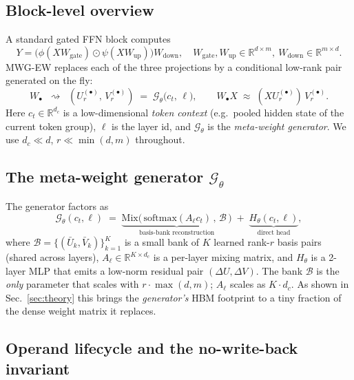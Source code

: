 \documentclass[11pt]{article}
\theoremstyle{definition}
\newcommand{\R}{\mathbb{R}}
\begin{document}
\subsection{Block-level overview}

A standard gated FFN block computes
\begin{equation}
Y = \big(\phi(XW_{\text{gate}})\odot \psi(XW_{\text{up}})\big)W_{\text{down}},
\quad W_{\text{gate}},W_{\text{up}}\in\R^{d\times m},\ W_{\text{down}}\in\R^{m\times d}.
\end{equation}
MWG-EW replaces each of the three projections by a conditional low-rank pair generated on the fly:
\begin{equation}
\boxed{\;\;
W_\bullet \;\;\rightsquigarrow\;\; (U^{(\bullet)}_r,\,V^{(\bullet)}_r) \;=\; \mathcal{G}_\theta\big(c_t,\,\ell\big),\qquad
W_\bullet X \;\approx\; (X U^{(\bullet)}_r)\,V^{(\bullet)}_r.
\;\;}
\end{equation}
Here $c_t\in\R^{d_c}$ is a low-dimensional \emph{token context} (e.g.\ pooled hidden state of the current token group), $\ell$ is the layer id, and $\mathcal{G}_\theta$ is the \emph{meta-weight generator}. We use $d_c{\ll}d$, $r{\ll}\min(d,m)$ throughout.

\subsection{The meta-weight generator $\mathcal{G}_\theta$}

The generator factors as
\begin{equation}
\mathcal{G}_\theta(c_t,\ell)\;=\; \underbrace{\mathrm{Mix}\big(\,\mathrm{softmax}(A_\ell c_t)\,,\,\mathcal{B}\,\big)}_{\text{basis-bank reconstruction}}
\;+\;\underbrace{H_\theta(c_t,\ell)}_{\text{direct head}},
\end{equation}
where $\mathcal{B}=\{(\bar U_k,\bar V_k)\}_{k=1}^K$ is a small bank of $K$ learned rank-$r$ basis pairs (shared across layers), $A_\ell\in\R^{K\times d_c}$ is a per-layer mixing matrix, and $H_\theta$ is a 2-layer MLP that emits a low-norm residual pair $(\Delta U,\Delta V)$. The bank $\mathcal{B}$ is the \emph{only} parameter that scales with $r{\cdot}\max(d,m)$; $A_\ell$ scales as $K{\cdot}d_c$. As shown in Sec.~\ref{sec:theory} this brings the \emph{generator's} HBM footprint to a tiny fraction of the dense weight matrix it replaces.

\subsection{Operand lifecycle and the no-write-back invariant}
\label{sec:lifecycle}
\end{document}
